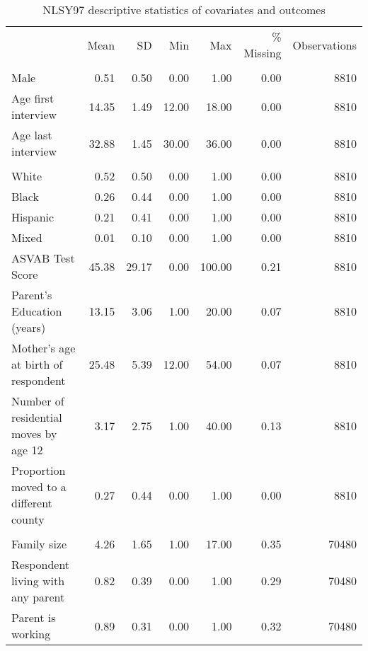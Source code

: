 \begin{table}[htp]
\setlength{\tabcolsep}{3pt}
\renewcommand{\arraystretch}{0.75}
\centering
\begin{threeparttable}
\centering
\caption{NLSY97 descriptive statistics of covariates and outcomes} 
\label{tab:nlsy97_descriptives}
\begingroup\fontsize{9pt}{10pt}\selectfont
\begin{tabular}{lrrrrrr}
  \hline
\addlinespace
  & Mean & SD & Min & Max & \% Missing & Observations \\
\addlinespace
 \hline
  \addlinespace
\multicolumn{7}{l}{\textbf{\textit{Time-invariant covariates}}} \\
\addlinespace
Male & 0.51 & 0.50 & 0.00 & 1.00 & 0.00 & 8810 \\ 
  Age first interview & 14.35 & 1.49 & 12.00 & 18.00 & 0.00 & 8810 \\ 
  Age last interview & 32.88 & 1.45 & 30.00 & 36.00 & 0.00 & 8810 \\ 
   \addlinespace
\multicolumn{7}{l}{\textit{Race-Ethnicity}} \\
\quad White & 0.52 & 0.50 & 0.00 & 1.00 & 0.00 & 8810 \\ 
  \quad Black & 0.26 & 0.44 & 0.00 & 1.00 & 0.00 & 8810 \\ 
  \quad Hispanic & 0.21 & 0.41 & 0.00 & 1.00 & 0.00 & 8810 \\ 
  \quad Mixed & 0.01 & 0.10 & 0.00 & 1.00 & 0.00 & 8810 \\ 
   \addlinespace
ASVAB Test Score & 45.38 & 29.17 & 0.00 & 100.00 & 0.21 & 8810 \\ 
  Parent's Education (years) & 13.15 & 3.06 & 1.00 & 20.00 & 0.07 & 8810 \\ 
  Mother's age at birth of respondent & 25.48 & 5.39 & 12.00 & 54.00 & 0.07 & 8810 \\ 
  Number of residential moves by age 12 & 3.17 & 2.75 & 1.00 & 40.00 & 0.13 & 8810 \\ 
  Proportion moved to a different county & 0.27 & 0.44 & 0.00 & 1.00 & 0.00 & 8810 \\ 
   \addlinespace
\multicolumn{7}{l}{\textbf{\textit{Time-variant covariates}}} \\
\addlinespace
Family size & 4.26 & 1.65 & 1.00 & 17.00 & 0.35 & 70480 \\ 
  Respondent living with any parent & 0.82 & 0.39 & 0.00 & 1.00 & 0.29 & 70480 \\ 
  Parent is working & 0.89 & 0.31 & 0.00 & 1.00 & 0.32 & 70480 \\ 

\end{tabular}
\end{threeparttable}
\end{table}
